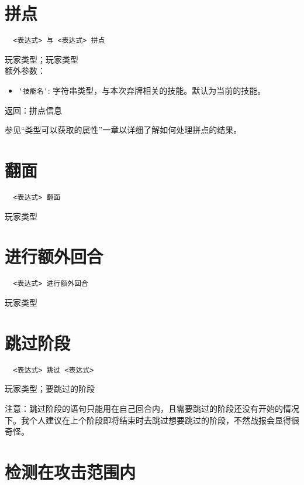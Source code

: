 \section{拼点}

\begin{verbatim}
  <表达式> 与 <表达式> 拼点
\end{verbatim}

玩家类型；玩家类型 \\

额外参数：

\begin{itemize}
  \item \verb|'技能名'|: 字符串类型，与本次弃牌相关的技能。默认为当前的技能。
\end{itemize}

返回：拼点信息

参见“类型可以获取的属性”一章以详细了解如何处理拼点的结果。

\section{翻面}

\begin{verbatim}
  <表达式> 翻面
\end{verbatim}

玩家类型

\section{进行额外回合}

\begin{verbatim}
  <表达式> 进行额外回合
\end{verbatim}

玩家类型

\section{跳过阶段}

\begin{verbatim}
  <表达式> 跳过 <表达式>
\end{verbatim}

玩家类型；要跳过的阶段

注意：跳过阶段的语句只能用在自己回合内，且需要跳过的阶段还没有开始的情况下。我个人建议在上个阶段即将结束时去跳过想要跳过的阶段，不然战报会显得很奇怪。

\section{检测在攻击范围内}

